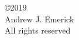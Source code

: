 \vspace*{7in}
\thispagestyle{empty}
\noindent
\setlength{\baselineskip}{0.625 \baselineskip}
\begin{center}
  \copyright 2019 \\
  \vspace{0.05in}
  Andrew J. Emerick \\
  All rights reserved
\end{center}
\setlength{\baselineskip}{1.6 \baselineskip}


\clearpage
